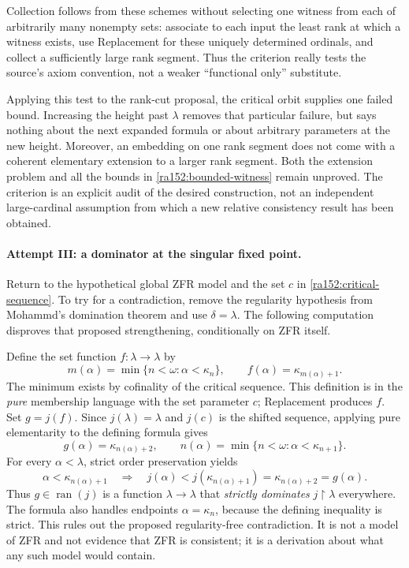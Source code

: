 \documentclass[11pt]{article}
\begin{document}
Collection follows from these schemes without selecting one witness from
each of arbitrarily many nonempty sets: associate to each input the least
rank at which a witness exists, use Replacement for these uniquely determined
ordinals, and collect a sufficiently large rank segment.  Thus the criterion
really tests the source's axiom convention, not a weaker ``functional only''
substitute.

Applying this test to the rank-cut proposal, the critical orbit supplies one
failed bound.  Increasing the height past $\lambda$ removes that particular
failure, but says nothing about the next expanded formula or about arbitrary
parameters at the new height.  Moreover, an embedding on one rank segment
does not come with a coherent elementary extension to a larger rank segment.
Both the extension problem and all the bounds in
\eqref{ra152:bounded-witness} remain unproved.  The criterion is an explicit
audit of the desired construction, not an independent large-cardinal
assumption from which a new relative consistency result has been obtained.

\paragraph{Attempt III: a dominator at the singular fixed point.}
Return to the hypothetical global ZFR model and the set $c$ in
\eqref{ra152:critical-sequence}.  To try for a contradiction, remove the
regularity hypothesis from Mohammd's domination theorem and use $\delta=\lambda$.
The following computation disproves that proposed strengthening, conditionally
on ZFR itself.

Define the set function $f:\lambda\to\lambda$ by
\[
 m(\alpha)=\min\{n<\omega:\alpha<\kappa_n\},\qquad
 f(\alpha)=\kappa_{m(\alpha)+1}.
\]
The minimum exists by cofinality of the critical sequence.  This definition is
in the \emph{pure} membership language with the set parameter $c$; Replacement
produces $f$.  Set $g=j(f)$.  Since $j(\lambda)=\lambda$ and $j(c)$ is the
shifted sequence, applying pure elementarity to the defining formula gives
\begin{equation}\label{ra152:singular-dominator}
 g(\alpha)=\kappa_{n(\alpha)+2},\qquad
 n(\alpha)=\min\{n<\omega:\alpha<\kappa_{n+1}\}.
\end{equation}
For every $\alpha<\lambda$, strict order preservation yields
\[
 \alpha<\kappa_{n(\alpha)+1}
 \quad\Longrightarrow\quad
 j(\alpha)<j(\kappa_{n(\alpha)+1})
       =\kappa_{n(\alpha)+2}=g(\alpha).
\]
Thus $g\in\operatorname{ran}(j)$ is a function $\lambda\to\lambda$ that
\emph{strictly dominates} $j\!\upharpoonright\!\lambda$ everywhere.
The formula also handles endpoints $\alpha=\kappa_n$, because the defining
inequality is strict.  This rules out the proposed regularity-free
contradiction.  It is not a model of ZFR and not evidence that ZFR is
consistent; it is a derivation about what any such model would contain.
\end{document}
